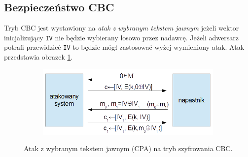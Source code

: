 \documentclass[a4paper,11pt]{article}
\theoremstyle{mytheor}
\begin{document}
\subsection*{Bezpieczeństwo CBC}
Tryb CBC jest wystawiony na \textit{atak z wybranym tekstem jawnym} jeżeli wektor inicjalizujący \texttt{IV} nie będzie wybierany losowo przez nadawcę. Jeżeli adwersarz potrafi przewidzieć \texttt{IV} to będzie mógł zastosować wyżej wymieniony atak. Atak przedstawia obrazek \ref{fig:cpa}.

\begin{figure}[]
    \begin{subfigure}{\textwidth}
        \includegraphics[width=1.0\linewidth]{cbc_atak_cpa.png}
    \end{subfigure}

    \caption{Atak z wybranym tekstem jawnym (CPA) na tryb szyfrowania CBC.}
    \label{fig:cpa}
\end{figure}
\end{document}
